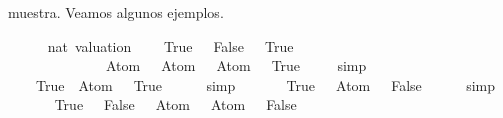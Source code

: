 \begin{isabellebody}
\begin{isamarkuptext}
  muestra. Veamos algunos ejemplos.%
\end{isamarkuptext}\isamarkuptrue%
\isamarkupfalse%
\isanewline
{}\isanewline
%
\isadelimproof
\ \ %
\endisadelimproof
%
\isatagproof
{}\isamarkupfalse%
\ {\isasymA}\ {\isacharcolon}{\isacharcolon}\ {\isachardoublequoteopen}nat\ valuation{\isachardoublequoteclose}\isanewline
\isanewline
{}\isamarkupfalse%
\ {\isachardoublequoteopen}{\isacharparenleft}{\isasymA}\ {\isacharparenleft}{}\ {\isacharcolon}{\isacharequal}\ True{\isacharcomma}\ {}\ {\isacharcolon}{\isacharequal}\ False{\isacharcomma}\ {}\ {\isacharcolon}{\isacharequal}\ True{\isacharparenright}\ \isanewline
\ \ \ \ \ \ \ \ \ \ \ \ {\isasymTurnstile}\ {\isacharparenleft}\isactrlbold {\isasymnot}\ {\isacharparenleft}{\isacharparenleft}Atom\ {}\ \isactrlbold {\isasymor}\ Atom\ {}{\isacharparenright}{\isacharparenright}\ \isactrlbold {\isasymrightarrow}\ Atom\ {}{\isacharparenright}{\isacharparenright}\ {\isacharequal}\ True{\isachardoublequoteclose}\ \isanewline
\ \ \isamarkupfalse%
\ simp\isanewline
\ \ \isanewline
\ \ \isamarkupfalse%
\ {\isachardoublequoteopen}{\isacharparenleft}{\isasymA}\ {\isacharparenleft}{}\ {\isacharcolon}{\isacharequal}\ True{\isacharparenright}\ {\isasymTurnstile}\ Atom\ {}{\isacharparenright}\ {\isacharequal}\ True{\isachardoublequoteclose}\isanewline
\ \ \ \ \isamarkupfalse%
\ simp\isanewline
\isanewline
\ \ \isamarkupfalse%
\ {\isachardoublequoteopen}{\isacharparenleft}{\isasymA}\ {\isacharparenleft}{}\ {\isacharcolon}{\isacharequal}\ True{\isacharparenright}\ {\isasymTurnstile}\ \isactrlbold {\isasymnot}\ {\isacharparenleft}Atom\ {}{\isacharparenright}{\isacharparenright}\ {\isacharequal}\ False{\isachardoublequoteclose}\isanewline
\ \ \ \ \isamarkupfalse%
\ simp\isanewline
\isanewline
\ \ \isamarkupfalse%
\ {\isachardoublequoteopen}{\isacharparenleft}{\isasymA}\ {\isacharparenleft}{}\ {\isacharcolon}{\isacharequal}\ True{\isacharcomma}\ {}\ {\isacharcolon}{\isacharequal}\ False{\isacharparenright}\ {\isasymTurnstile}\ \isactrlbold {\isasymnot}\ {\isacharparenleft}Atom\ {}{\isacharparenright}\ \isactrlbold {\isasymand}\ {\isacharparenleft}Atom\ {}{\isacharparenright}{\isacharparenright}\ {\isacharequal}\ False{\isachardoublequoteclose}\isanewline
\ \ \ \ \isamarkupfalse%

\end{isabellebody}
